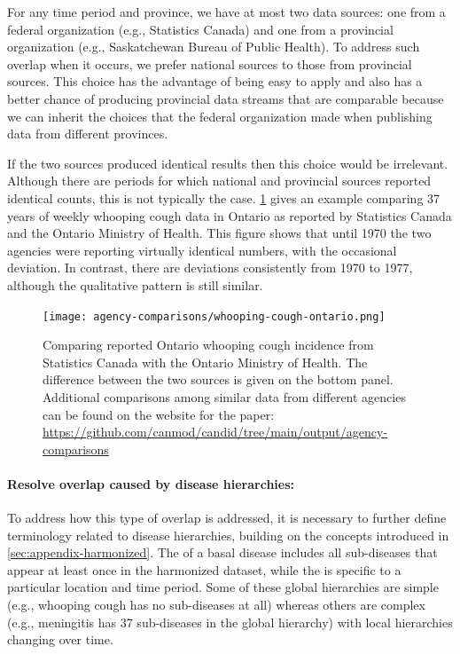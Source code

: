 \documentclass[12pt]{article}
\begin{document}
For any time period and province, we have at most two data sources: one from a federal organization (e.g., Statistics Canada) and one from a provincial organization (e.g., Saskatchewan Bureau of Public Health). To address such overlap when it occurs, we prefer national sources to those from provincial sources. This choice has the advantage of being easy to apply and also has a better chance of producing provincial data streams that are comparable because we can inherit the choices that the federal organization made when publishing data from different provinces.

If the two sources produced identical results then this choice would be irrelevant. Although there are periods for which national and provincial sources reported identical counts, this is not typically the case. \cref{fig:appendix-statcanmoh} gives an example comparing 37 years of weekly whooping cough data in Ontario as reported by Statistics Canada and the Ontario Ministry of Health. This figure shows that until 1970 the two agencies were reporting virtually identical numbers, with the occasional deviation. In contrast, there are deviations consistently from 1970 to 1977, although the qualitative pattern is still similar.

\begin{figure}
  \texttt{[image: agency-comparisons/whooping-cough-ontario.png]}
\caption{Comparing reported Ontario whooping cough incidence from Statistics Canada with the Ontario Ministry of Health. The difference between the two sources is given on the bottom panel. Additional comparisons among similar data from different agencies can be found on the website for the paper: \url{https://github.com/canmod/candid/tree/main/output/agency-comparisons}}\label{fig:appendix-statcanmoh}
\end{figure}

\paragraph{Resolve overlap caused by disease hierarchies:} To address how this type of overlap is addressed, it is necessary to further define terminology related to disease hierarchies, building on the concepts introduced in \cref{sec:appendix-harmonized}. The  of a basal disease includes all sub-diseases that appear at least once in the harmonized dataset, while the  is specific to a particular location and time period. Some of these global hierarchies are simple (e.g., whooping cough has no sub-diseases at all) whereas others are complex (e.g., meningitis has 37 sub-diseases in the global hierarchy) with local hierarchies changing over time. 
\end{document}
